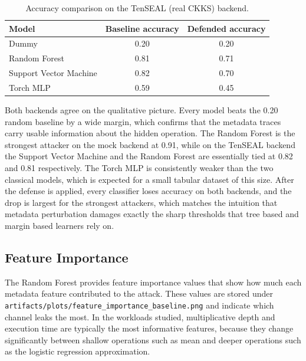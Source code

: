 \documentclass[12pt,a4paper]{article}
\begin{document}
\begin{table}[h]
\centering
\caption{Accuracy comparison on the TenSEAL (real CKKS) backend.}
\label{tab:acc_tenseal}
\begin{tabular}{lcc}
\toprule
\textbf{Model} & \textbf{Baseline accuracy} & \textbf{Defended accuracy} \\
\midrule
Dummy                   & 0.20 & 0.20 \\
Random Forest           & 0.81 & 0.71 \\
Support Vector Machine  & 0.82 & 0.70 \\
Torch MLP               & 0.59 & 0.45 \\
\bottomrule
\end{tabular}
\end{table}

Both backends agree on the qualitative picture. Every model beats the 0.20 random baseline by a wide margin, which confirms that the metadata traces carry usable information about the hidden operation. The Random Forest is the strongest attacker on the mock backend at 0.91, while on the TenSEAL backend the Support Vector Machine and the Random Forest are essentially tied at 0.82 and 0.81 respectively. The Torch MLP is consistently weaker than the two classical models, which is expected for a small tabular dataset of this size. After the defense is applied, every classifier loses accuracy on both backends, and the drop is largest for the strongest attackers, which matches the intuition that metadata perturbation damages exactly the sharp thresholds that tree based and margin based learners rely on.


\subsection{Feature Importance}
The Random Forest provides feature importance values that show how much each metadata feature contributed to the attack. These values are stored under \texttt{artifacts/plots/feature\_importance\_baseline.png} and indicate which channel leaks the most. In the workloads studied, multiplicative depth and execution time are typically the most informative features, because they change significantly between shallow operations such as mean and deeper operations such as the logistic regression approximation.
\end{document}

